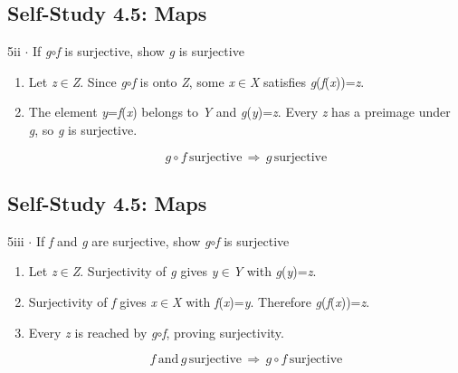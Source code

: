 \documentclass[11pt]{article}
\begin{document}
\begin{keepsection}\subsection{Self-Study 4.5: Maps}

\begin{workedbox}{5ii \ensuremath{\cdot} If \textit{g}\ensuremath{\circ}\textit{f} is surjective, show \textit{g} is surjective}
\begin{enumerate}
\item Let \textit{z}\ensuremath{\in}\textit{Z}. Since \textit{g}\ensuremath{\circ}\textit{f} is onto \textit{Z}, some \textit{x}\ensuremath{\in}\textit{X} satisfies \textit{g}(\textit{f}(\textit{x}))=\textit{z}.
\item {}
The element \textit{y}=\textit{f}(\textit{x}) belongs to \textit{Y} and \textit{g}(\textit{y})=\textit{z}. Every \textit{z} has a preimage under \textit{g}, so \textit{g} is surjective.

\begin{equation*}{g}\circ {f}\, \text{surjective}\, \Rightarrow \, {g}\, \text{surjective}\end{equation*}
\end{enumerate}
\end{workedbox}

\end{keepsection}
\begin{keepsection}\subsection{Self-Study 4.5: Maps}

\begin{workedbox}{5iii \ensuremath{\cdot} If \textit{f} and \textit{g} are surjective, show \textit{g}\ensuremath{\circ}\textit{f} is surjective}
\begin{enumerate}
\item Let \textit{z}\ensuremath{\in}\textit{Z}. Surjectivity of \textit{g} gives \textit{y}\ensuremath{\in}\textit{Y} with \textit{g}(\textit{y})=\textit{z}.
\item Surjectivity of \textit{f} gives \textit{x}\ensuremath{\in}\textit{X} with \textit{f}(\textit{x})=\textit{y}. Therefore \textit{g}(\textit{f}(\textit{x}))=\textit{z}.
\item {}
Every \textit{z} is reached by \textit{g}\ensuremath{\circ}\textit{f}, proving surjectivity.

\begin{equation*}{f}\, \text{and}\, {g}\, \text{surjective}\, \Rightarrow \, {g}\circ {f}\, \text{surjective}\end{equation*}
\end{enumerate}
\end{workedbox}

\end{keepsection}
\end{document}
